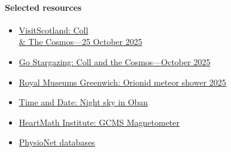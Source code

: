 \documentclass{article}
\begin{document}
\paragraph{Selected resources}
\begin{itemize}
    \item \href{https://www.visitscotland.com/info/events/coll-the-cosmos-25th-p3435721}{VisitScotland: Coll \\& The Cosmos---25 October 2025}
    \item \href{https://gostargazing.co.uk/events/coll-and-the-cosmos-october-2025/}{Go Stargazing: Coll and the Cosmos---October 2025}
    \item \href{https://www.rmg.co.uk/stories/space-astronomy/orionid-meteor-shower-2025-when-where-see-it-uk}{Royal Museums Greenwich: Orionid meteor shower 2025}
    \item \href{https://www.timeanddate.com/astronomy/night/uk/oban}{Time and Date: Night sky in Oban}
    \item \href{https://www.heartmath.org/gci/gcms/live-data/gcms-magnetometer/}{HeartMath Institute: GCMS Magnetometer}
    \item \href{https://physionet.org/about/database/}{PhysioNet databases}
\end{itemize}
\end{document}
